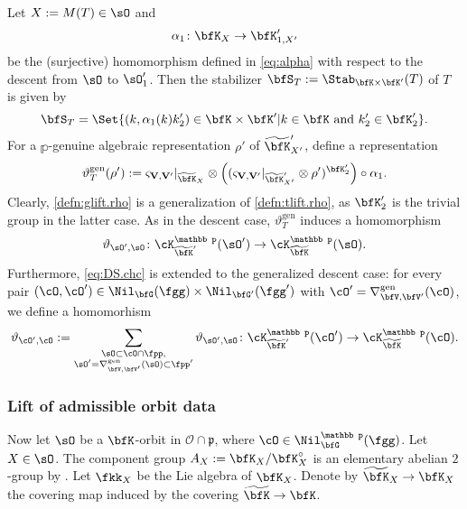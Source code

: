 \documentclass[12pt,a4paper]{amsart}
\newcommand{\CO}{{\mathcal {O}}}
\newcommand{\wt}{\widetilde}
\newcommand{\p}{\mathfrak p}
\def\gDD{\nabla^{\mathrm{gen}}}
\numberwithin{equation}{section}
\theoremstyle{remark}
\def\wtbfK{\widetilde{\bfK}}
\def\dliftv{\vartheta}
\def\gdlift{\vartheta^{\mathrm{gen}}}
\def\bbfK{\wtbfK}
\def\mktvvp{\varsigma_{{\bf V},{\bf V}'}}
\begin{document}
  Let $X := M(T)\in \sO$ and
  \begin{equation}\label{eq:def.alpha1}
    \alpha_1\colon \bfK_X \rightarrow \bfK'_{1,X'}
  \end{equation}
  be
  the (surjective) homomorphism defined in
  \cref{eq:alpha} with respect to the descent from $\sO$ to $\sO'_1$.
  Then the stabilizer $\bfS_T := \Stab_{\bfK\times
    \bfK'}(T)$ of $T$ is given by
  \begin{equation}\label{labst}
    \bfS_T = \Set{(k,\alpha_1(k)k'_2)\in \bfK\times \bfK' |k\in \bfK \text{ and } k'_2\in \bfK'_2}.
  \end{equation}
  For a $\mathbb p$-genuine algebraic representation $\rho'$ of $\wtbfK'_{X'}$, define a
  representation
  \begin{equation}\label{defn:glift.rho}
    \gdlift_{T}(\rho'):= \mktvvp|_{\wt{\bfK}_{X}} \otimes \left((\mktvvp|_{\wt{\bfK}'_{X'}}\otimes
      \rho')^{\bfK'_2}\right)\circ \alpha_1.
  \end{equation}
  Clearly, \cref{defn:glift.rho} is a generalization of \cref{defn:tlift.rho}, as ${\bfK'_2}$ is the trivial group in the latter case.
  As in the descent case, $\gdlift_{T}$ induces a homomorphism
  \[
    \dliftv_{\sO',\sO}\colon \cK^{\mathbb p}_{\wt{\bfK}'}(\sO')
    \rightarrow \cK^{\mathbb p}_{\wt{\bfK}}(\sO).
  \]
  Furthermore, \cref{eq:DS.chc} is extended to the generalized descent case: for every pair $(\cO,\cO')\in \Nil_{\bfG}(\fgg)\times  \Nil_{\bfG'}(\fgg')$ with $\cO' =\gDD_{\bfV,\bfV'}(\cO)$, we define a homomorhism
  \[
    \dliftv_{\cO',\cO} := \sum_{\substack{\sO \subset \cO\cap \fpp,\\
        \sO' = \gDD_{\bfV,\bfV'}(\sO)\subset \fpp'}}\dliftv_{\sO',\sO}\colon \cK^{\mathbb p}_{\wt{\bfK}'}(\cO')
    \rightarrow \cK^{\mathbb p}_{\wt{\bfK}}(\cO).
  \]




  \subsubsection{Lift of admissible orbit data}\label{sec:aod}


  Now let $\sO$ be a $\bfK$-orbit in $\CO\cap \p$, where
  $\cO\in \Nil_{\bfG}^{\mathbb p}(\fgg)$. Let $X\in \sO$.   The component group  $A_X:=\bfK_X/\bfK_X^\circ$  is an
  elementary abelian $2$-group by .  Let $\fkk_X$ be the Lie algebra of $\bfK_X$. Denote by $\bbfK_X\rightarrow \bfK_X$ the covering map induced by the covering $\bbfK\rightarrow \bfK$.
\end{document}
